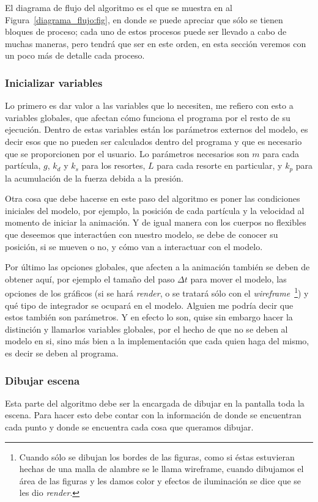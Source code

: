 El diagrama de flujo del algoritmo es el que se muestra en al Figura~\ref{diagrama_flujo:fig}, en donde se puede apreciar que sólo se tienen bloques de proceso; cada uno de estos procesos puede ser llevado a cabo de muchas maneras, pero tendrá que ser en este orden, en esta sección veremos con un poco más de detalle cada proceso.

\subsubsection{Inicializar variables}
Lo primero es dar valor a las variables que lo necesiten, me refiero con esto a variables globales, que afectan cómo funciona el programa por el resto de su ejecución.
Dentro de estas variables están los parámetros externos del modelo, es decir esos que no pueden ser calculados dentro del programa y que es necesario que se proporcionen por el usuario.
Lo parámetros necesarios son $m$ para cada partícula, $g$, $k_d$ y $k_s$ para los resortes, $L$ para cada resorte en particular, y $k_p$ para la acumulación de la fuerza debida a la presión.

Otra cosa que debe hacerse en este paso del algoritmo es poner las condiciones iniciales del modelo, por ejemplo, la posición de cada partícula y la velocidad al momento de iniciar la animación.
Y de igual manera con los cuerpos no flexibles que deseemos que interactúen con nuestro modelo, se debe de conocer su posición, si se mueven o no, y cómo van a interactuar con el modelo.

Por último las opciones globales, que afecten a la animación también se deben de obtener aquí, por ejemplo el tamaño del paso $\Delta t$ para mover el modelo, las opciones de los gráficos (si se hará \emph{\foreignlanguage{english}{render}}, o se tratará sólo con el \emph{\foreignlanguage{english}{wireframe}}~\footnote{Cuando sólo se dibujan los bordes de las figuras, como si éstas estuvieran hechas de una malla de alambre se le llama wireframe, cuando dibujamos el área de las figuras y les damos color y efectos de iluminación se dice que se les dio \emph{render}.}) y qué tipo de integrador se ocupará en el modelo.
Alguien me podría decir que estos también son parámetros.
Y en efecto lo son, quise sin embargo hacer la distinción y llamarlos variables globales, por el hecho de que no se deben al modelo en si, sino más bien a la implementación que cada quien haga del mismo, es decir se deben al programa.

\subsubsection{Dibujar escena}
Esta parte del algoritmo debe ser la encargada de dibujar en la pantalla toda la escena.
Para hacer esto debe contar con la información de donde se encuentran cada punto y donde se encuentra cada cosa que queramos dibujar.

